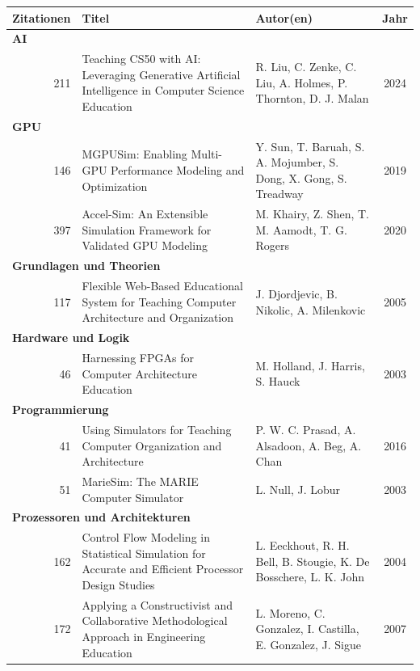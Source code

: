 \begin{table}[htbp]
    \centering
    \tiny
    \begin{tabularx}{\textwidth}{r X l c}
        \hline
        \textbf{Zitationen} & \textbf{Titel} & \textbf{Autor(en)} & \textbf{Jahr} \\
        \hline
        \multicolumn{4}{l}{\textbf{AI}} \\
        211 & Teaching CS50 with AI: Leveraging Generative Artificial Intelligence in Computer Science Education & R. Liu, C. Zenke, C. Liu, A. Holmes, P. Thornton, D. J. Malan & 2024 \\
        \hline
        \multicolumn{4}{l}{\textbf{GPU}} \\
        146 & MGPUSim: Enabling Multi-GPU Performance Modeling and Optimization & Y. Sun, T. Baruah, S. A. Mojumber, S. Dong, X. Gong, S. Treadway & 2019 \\
        397 & Accel-Sim: An Extensible Simulation Framework for Validated GPU Modeling & M. Khairy, Z. Shen, T. M. Aamodt, T. G. Rogers & 2020 \\
        \hline
        \multicolumn{4}{l}{\textbf{Grundlagen und Theorien}} \\
        117 & Flexible Web-Based Educational System for Teaching Computer Architecture and Organization & J. Djordjevic, B. Nikolic, A. Milenkovic & 2005 \\
        \hline
        \multicolumn{4}{l}{\textbf{Hardware und Logik}} \\
        46 & Harnessing FPGAs for Computer Architecture Education & M. Holland, J. Harris, S. Hauck & 2003 \\
        \hline
        \multicolumn{4}{l}{\textbf{Programmierung}} \\
        41 & Using Simulators for Teaching Computer Organization and Architecture & P. W. C. Prasad, A. Alsadoon, A. Beg, A. Chan & 2016 \\
        51 & MarieSim: The MARIE Computer Simulator & L. Null, J. Lobur & 2003 \\
        \hline
        \multicolumn{4}{l}{\textbf{Prozessoren und Architekturen}} \\
        162 & Control Flow Modeling in Statistical Simulation for Accurate and Efficient Processor Design Studies & L. Eeckhout, R. H. Bell, B. Stougie, K. De Bosschere, L. K. John & 2004 \\
        172 & Applying a Constructivist and Collaborative Methodological Approach in Engineering Education & L. Moreno, C. Gonzalez, I. Castilla, E. Gonzalez, J. Sigue & 2007 \\

\end{tabularx}
\end{table}
